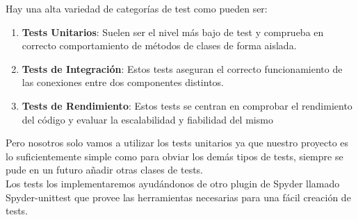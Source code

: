 \documentclass[12pt,a4paper]{article}
\begin{document}
	 Hay una alta variedad de categorías de test como pueden ser:\\
	 \begin{enumerate}
	 \item \textbf{Tests Unitarios}: Suelen ser el nivel más bajo de test y comprueba en correcto comportamiento de métodos de clases de forma aislada.
	 \item \textbf{Tests de Integración}: Estos tests aseguran el correcto funcionamiento de las conexiones entre dos componentes distintos.
	 \item \textbf{Tests de Rendimiento}: Estos tests se centran en comprobar el rendimiento del código y evaluar la escalabilidad y fiabilidad del mismo
	 \end{enumerate}
	 Pero nosotros solo vamos a utilizar los tests unitarios ya que nuestro proyecto es lo suficientemente simple como para obviar los demás tipos de tests, siempre se pude en un futuro añadir otras clases de tests.\\
	 Los tests los implementaremos ayudándonos de otro plugin de Spyder llamado Spyder-unittest que provee las herramientas necesarias para una fácil creación de tests.\\
\end{document}
